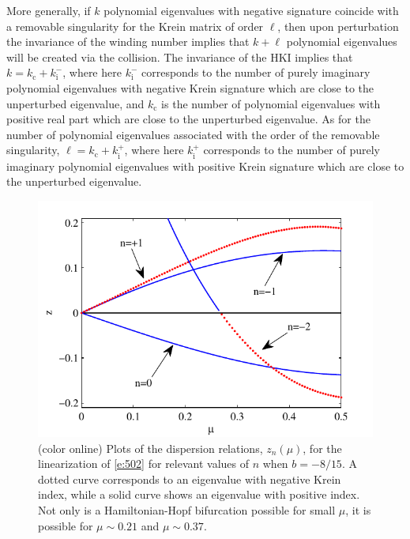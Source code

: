 \documentclass[review,onefignum,onetabnum]{siamart171218}
\newcommand{\rmc}{\mathrm{c}}
\newcommand{\rmi}{\mathrm{i}}
\begin{document}
\begin{remark}
More generally, if $k$ polynomial eigenvalues with negative signature
coincide with a removable singularity for the Krein matrix of order $\ell$,
then upon perturbation the invariance of the winding number implies that
$k+\ell$ polynomial eigenvalues will be created via the collision. The
invariance of the HKI implies that $k=k_\rmc+k_\rmi^-$, where here $k_\rmi^-$
corresponds to the number of purely imaginary polynomial eigenvalues with
negative Krein signature which are close to the unperturbed eigenvalue, and
$k_\rmc$ is the number of polynomial eigenvalues with positive real part
which are close to the unperturbed eigenvalue. As for the number of
polynomial eigenvalues associated with the order of the removable
singularity, $\ell=k_\rmc+k_\rmi^+$, where  here $k_\rmi^+$ corresponds to
the number of purely imaginary polynomial eigenvalues with positive Krein
signature which are close to the unperturbed eigenvalue.
\end{remark}

\begin{figure}[ht]%
\begin{center}
\includegraphics{FifthOrderKdVSpectra}
\caption{(color online) Plots of the dispersion relations, $z_n(\mu)$, for the linearization of
\cref{e:502} for relevant values of $n$ when $b=-8/15$. A dotted curve corresponds to an eigenvalue with negative Krein index,
while a solid curve shows an eigenvalue with positive index. Not only is a Hamiltonian-Hopf
bifurcation possible for small $\mu$, it is possible for $\mu\sim0.21$ and $\mu\sim0.37$.}
\label{f:FifthOrderKdVSpectra}
\end{center}
\end{figure}
\end{document}
